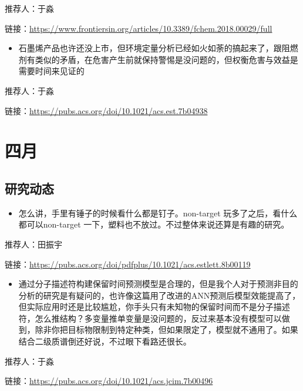 \documentclass[
]{book}
\providecommand{\tightlist}{%
  \setlength{\itemsep}{0pt}\setlength{\parskip}{0pt}}
\begin{document}
推荐人：于淼

链接：\url{https://www.frontiersin.org/articles/10.3389/fchem.2018.00029/full}

\begin{itemize}
\tightlist
\item
  石墨烯产品也许还没上市，但环境定量分析已经如火如荼的搞起来了，跟阻燃剂有类似的矛盾，在危害产生前就保持警惕是没问题的，但权衡危害与效益是需要时间来见证的
\end{itemize}

推荐人：于淼

链接：\url{https://pubs.acs.org/doi/10.1021/acs.est.7b04938}

\hypertarget{ux56dbux6708}{%
\section*{四月}\label{ux56dbux6708}}

\hypertarget{ux7814ux7a76ux52a8ux6001-5}{%
\subsection*{研究动态}\label{ux7814ux7a76ux52a8ux6001-5}}

\begin{itemize}
\tightlist
\item
  怎么讲，手里有锤子的时候看什么都是钉子。non-target 玩多了之后，看什么都可以non-target 一下，塑料也不放过。不过整体来说还算是有趣的研究。
\end{itemize}

推荐人：田振宇

链接：\url{https://pubs.acs.org/doi/pdfplus/10.1021/acs.estlett.8b00119}

\begin{itemize}
\tightlist
\item
  通过分子描述符构建保留时间预测模型是合理的，但是我个人对于预测非目的分析的研究是有疑问的，也许像这篇用了改进的ANN预测后模型效能提高了，但实际应用时还是比较尴尬，你手头只有未知物的保留时间而不是分子描述符，怎么推结构？多变量推单变量是没问题的，反过来基本没有模型可以做到，除非你把目标物限制到特定种类，但如果限定了，模型就不通用了。如果结合二级质谱倒还好说，不过眼下看路还很长。
\end{itemize}

推荐人：于淼

链接：\url{https://pubs.acs.org/doi/10.1021/acs.jcim.7b00496}
\end{document}
